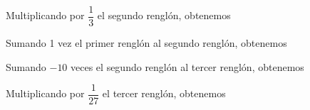 \begin{examplebox}{}{}
\begin{matrizn}
    \end{matrizn}
    Multiplicando por $\dfrac{1}{3}$ el segundo renglón, obtenemos
    \begin{matrizn}
    \end{matrizn}
    Sumando 1 vez el primer renglón al segundo renglón, obtenemos
    \begin{matrizn}
    \end{matrizn}
    \newpage
    Sumando $-10$ veces el segundo renglón al tercer renglón, obtenemos
    \begin{matrizn}
    \end{matrizn}
    Multiplicando por $\dfrac{1}{27}$ el tercer renglón, obtenemos

\end{examplebox}
